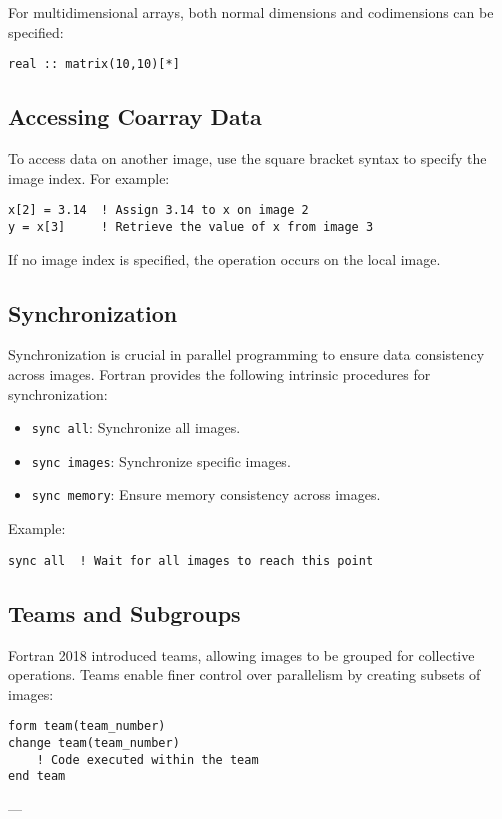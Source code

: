 For multidimensional arrays, both normal dimensions and codimensions can be specified:
\begin{lstlisting}
real :: matrix(10,10)[*]
\end{lstlisting}

\subsection{Accessing Coarray Data}
To access data on another image, use the square bracket syntax to specify the image index. For example:
\begin{lstlisting}
x[2] = 3.14  ! Assign 3.14 to x on image 2
y = x[3]     ! Retrieve the value of x from image 3
\end{lstlisting}

If no image index is specified, the operation occurs on the local image.

\subsection{Synchronization}
Synchronization is crucial in parallel programming to ensure data consistency across images. Fortran provides the following intrinsic procedures for synchronization:
\begin{itemize}
    \item \texttt{sync all}: Synchronize all images.
    \item \texttt{sync images}: Synchronize specific images.
    \item \texttt{sync memory}: Ensure memory consistency across images.
\end{itemize}

Example:
\begin{lstlisting}
sync all  ! Wait for all images to reach this point
\end{lstlisting}

\subsection{Teams and Subgroups}
Fortran 2018 introduced teams, allowing images to be grouped for collective operations. Teams enable finer control over parallelism by creating subsets of images:
\begin{lstlisting}
form team(team_number)
change team(team_number)
    ! Code executed within the team
end team
\end{lstlisting}

---

